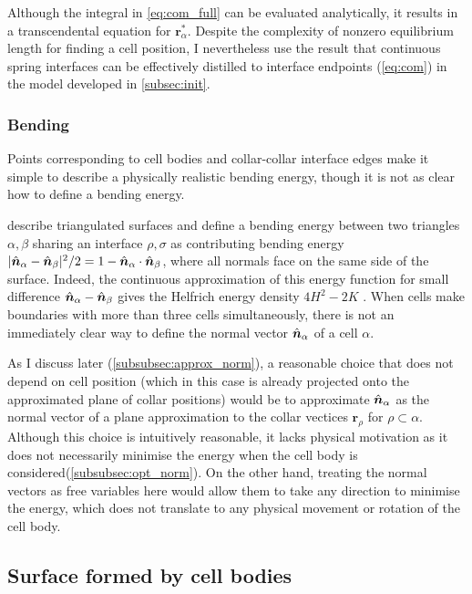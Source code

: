 Although the integral in \cref{eq:com_full} can be evaluated analytically, it results in a transcendental equation for $\bm{r}_\alpha^*$. 
Despite the complexity of nonzero equilibrium length for finding a cell position, I nevertheless use the result that continuous spring interfaces can be effectively distilled to interface endpoints (\cref{eq:com}) in the model developed in \cref{subsec:init}.

\subsubsection{Bending} \label{subsubsec:bending}

Points corresponding to cell bodies and collar-collar interface edges make it simple to describe a physically realistic bending energy, though it is not as clear how to define a bending energy.

\citet{seung1988} describe triangulated surfaces and define a bending energy between two triangles $\alpha,\beta$ sharing an interface $\rho, \sigma$ as contributing bending energy $|\hat{\bm{n}}_\alpha - \hat{\bm{n}}_\beta|^2/2 = 1 - \hat{\bm{n}}_\alpha \cdot \hat{\bm{n}}_\beta$, where all normals face on the same side of the surface. 
Indeed, the continuous approximation of this energy function for small difference $\hat{\bm{n}}_\alpha - \hat{\bm{n}}_\beta$ gives the Helfrich energy density $4H^2 - 2K$ \citep{helfrich1973}. 
When cells make boundaries with more than three cells simultaneously, there is not an immediately clear way to define the normal vector $\hat{\bm{n}}_\alpha$ of a cell $\alpha$. 

As I discuss later (\cref{subsubsec:approx_norm}), a reasonable choice that does not depend on cell position (which in this case is already projected onto the approximated plane of collar positions) would be to approximate $\hat{\bm{n}}_\alpha$ as the normal vector of a plane approximation to the collar vectices $\bm{r}_\rho$ for $\rho\subset\alpha$. 
Although this choice is intuitively reasonable, it lacks physical motivation as it does not necessarily minimise the energy when the cell body is considered(\cref{subsubsec:opt_norm}).
On the other hand, treating the normal vectors as free variables here would allow them to take any direction to minimise the energy, which does not translate to any physical movement or rotation of the cell body. 

\subsection{Surface formed by cell bodies}


